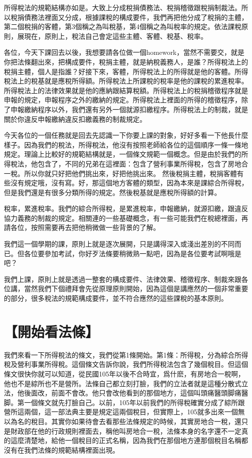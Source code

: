 \documentclass[oneside,sub3section]{ctexbook}
\begin{document}
所得稅法的規範結構亦如是。大致上分成稅捐債務法、稅捐稽徵跟稅捐制裁法。所以稅捐債務法裡面又分成，根據課稅的構成要件，我們再把他分成了稅捐的主體，第二個稅捐的客體，第3個稱之為叫稅基，第4個稱之為叫稅率的規定。依法課稅原則，展現在，原則上，稅法自己會定這些主體、客體、稅基、稅率。

各位，今天下課回去以後，我想要請各位做一個homework，當然不需要交，就是你把法條翻出來，把構成要件，稅捐主體，就是納稅義務人，是誰？所得稅法上的稅捐主體，個人是指誰？好接下來，客體，所得稅法上的所得就是他的客體。所得稅法上的稅基就是應稅所得額。所得稅法上所課稅的稅率是他的課稅的累進稅率。所得稅法上的法律效果就是他的應納跟結算稅額。所得稅法上的稅捐稽徵程序就是申報的規定，申報程序之外的繳納的規定。所得稅法上裡面的所得的稽徵程序，除了申報繳納程序以外，我們還有另外一個就源扣繳程序。所得稅法上的制裁，就是關於你違反申報繳納違反扣繳義務的制裁規定。

今天各位的一個任務就是回去先認識一下你要上課的對象，好好多看一下他長什麼樣子。因為我們的稅法，所得稅法，他沒有按照老師給各位的這個順序一條一條地規定。理論上比較好的規範結構就是，一個條文規範一個概念。但是由於我們的所得稅法，他包含了，不同的兄弟在這裡面：包含了營利事業所得稅，包含了房地合一稅。所以你就只好把他們挑出來，好把他挑出來。
然後稅捐主體，稅捐客體有些沒有規定哦，沒有寫。好，那這個地方客體的類型，因為本來是課綜合所得稅，但是我們還是有很多分類所得的規定。然後稅基就是應稅所得額的計算。

稅率，累進稅率。我們的綜合所得稅，是累進稅率，申報繳納，就源扣繳，跟違反協力義務的制裁的規定。相關連的一些基礎概念，有一些可能我們在稅總裡面，再請各位，按照需要再去把他稍微做一些背景的了解。

我們這一個學期的課，原則上就是逐次展開，只是講得深入或淺出差別的不同而已。但各位要參加考試，你好歹法條要稍微熟一點吧，因為是各位要考試啊哦是吧？

我們上課，原則上就是透過一整套的構成要件、法律效果、稽徵程序、制裁來跟各位講，當然我們下個禮拜會先從原理原則開始，因為這個是講應然的一個非常重要的部分，很多稅法的規範構成要件，並不符合應然的這些課稅的基本原則。

\hypertarget{ux958bux59cbux770bux6cd5ux689d}{%
\section{【開始看法條】}\label{ux958bux59cbux770bux6cd5ux689d}}

我們來看一下所得稅法的條文，我們從第1條開始。第1條：所得稅，分為綜合所得稅及營利事業所得稅。這個條文告訴你說，我們所得稅法包含了幾個稅目。但這個條文很快你就可以知道，從民國105年以後不合時宜，爲什麽，有房地合一稅啊，他也不是綜所也不是營所。法條自己都立刻打臉，我們的立法者就是這種分散式立法，他後面改，前面不會改。他只會改他看到的那個地方，這個叫頭痛醫頭脚痛醫脚。第一個條文就先打臉自己。以前，105年以前我們的所得稅確實分成了綜所跟營所這兩個，這一部法典主要是規定這兩個稅目，但實際上，105就多出來一個無以為名的稅目。其實你如果待會去看那些法條規定的時候，其實房地合一稅，還只是財政部在他的行政規則裡面去，稱他叫房地合一稅，法條本身的名字還不一定真的這麼清楚地，給他一個稅目的正式名稱，因為我們在那個地方連那個稅目名稱都沒有在我們法條的規範結構裡面出現。
\end{document}
